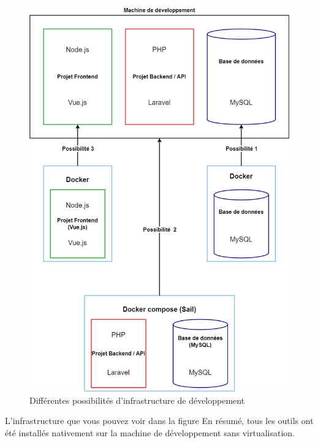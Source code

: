 \documentclass[
    iai, %
    il, %
]{heig-tb}
\begin{document}
\begin{center}
    \begin{figure}
        \includegraphics[width=\textwidth]{./assets/figures/infrastructure-dev-choix.drawio.png}
        \caption{Différentes possibilités d'infrastructure de développement \label{infrastructure-dev-choix.drawio}}
    \end{figure}
\end{center}

L'infrastructure que vous pouvez voir dans la figure %
En résumé, tous les outils ont été installés nativement sur la machine de développement sans virtualisation.
\end{document}
